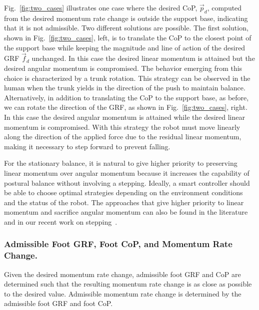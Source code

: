 \documentclass{llncs}
\newcommand{\vp}{\vec{p}}
\newcommand{\vf}{\vec{f}}
\begin{document}
Fig.~\ref{fig:two_cases} illustrates one case where the desired CoP, $\vp_d$,
computed from the desired momentum rate change is outside the support base,
indicating that it is not admissible.
Two different solutions are possible.
The first solution, shown in Fig.~\ref{fig:two_cases}, left, is to translate the CoP to the closest
point of the support base while keeping the magnitude and line of action of the
desired GRF $\vf_d$ unchanged. In this case the
desired linear momentum is attained but the desired
angular momentum is compromised. The behavior emerging from this choice
is characterized by a trunk rotation. This strategy can be observed in the
human when the trunk yields in the direction of the push to maintain balance.
Alternatively, in addition to
translating the CoP to the support base, as before, we can rotate
the direction of the GRF, as shown in Fig.~\ref{fig:two_cases}, right. In this case the desired
angular momentum is
attained while the desired linear momentum
 is compromised. With this strategy
 the robot must move linearly along the direction of the applied force
due to the residual linear momentum, making it necessary to step forward
to prevent falling.

For the stationary balance, it is natural to give higher priority to preserving linear momentum over angular
momentum because it increases the capability of postural balance without
involving a stepping.
Ideally, a smart controller should be able to choose
optimal strategies depending on the environment conditions
and the status of the robot.
The approaches that give higher priority to linear
momentum and sacrifice angular momentum can also be found
in the literature~\cite{Hofmann09,Stephens10} and in our recent work on stepping~\cite{YG11}.

\subsubsection{Admissible Foot GRF, Foot CoP, and Momentum Rate Change.}
\label{sec:local_grf}

Given the desired momentum rate change, admissible foot GRF and CoP are determined such that the resulting momentum
rate change is as close as possible to the desired value.
Admissible momentum rate change is determined by
the admissible foot GRF and foot CoP.
\end{document}
